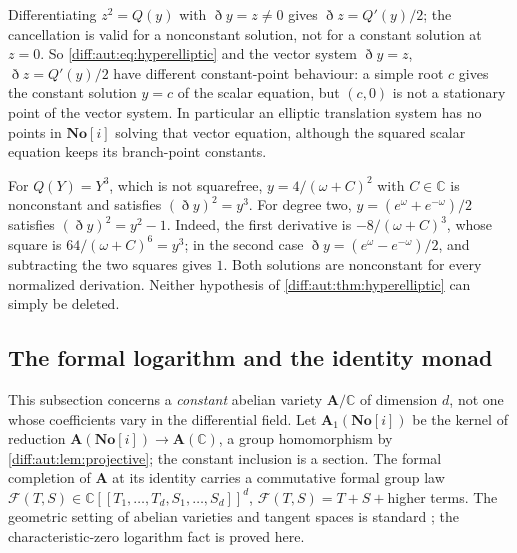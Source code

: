 \documentclass[11pt,letterpaper]{article}
\numberwithin{equation}{section}
\theoremstyle{definition}
\theoremstyle{remark}
\newcommand{\SC}{\mathbf{No}[i]}
\newcommand{\C}{\mathbb C}
\newcommand{\Dn}{\eth}
\begin{document}
\begin{remark}
\label{diff:aut:rem:branchpoints}
Differentiating $z^{2}=Q(y)$ with $\Dn y=z\neq0$ gives $\Dn z=Q'(y)/2$; the
cancellation is valid for a nonconstant solution, not for a constant solution
at $z=0$. So \cref{diff:aut:eq:hyperelliptic} and the vector system
$\Dn y=z$, $\Dn z=Q'(y)/2$ have different constant-point behaviour: a simple root
$c$ gives the constant solution $y=c$ of the scalar equation, but $(c,0)$ is not a
stationary point of the vector system. In particular an elliptic translation
system has no points in $\SC$ solving that vector equation, although the squared
scalar equation keeps its branch-point constants.
\end{remark}

\begin{example}
\label{diff:aut:ex:hypotheses}
For $Q(Y)=Y^{3}$, which is not squarefree, $y=4/(\omega+C)^{2}$ with $C\in\C$ is
nonconstant and satisfies $(\Dn y)^{2}=y^{3}$. For degree two,
$y=(e^{\omega}+e^{-\omega})/2$ satisfies $(\Dn y)^{2}=y^{2}-1$.
Indeed, the first derivative is $-8/(\omega+C)^3$, whose square
is $64/(\omega+C)^6=y^3$; in the second case
$\Dn y=(e^\omega-e^{-\omega})/2$, and subtracting the two
squares gives $1$. Both solutions are nonconstant for every
normalized derivation. Neither hypothesis of
\cref{diff:aut:thm:hyperelliptic} can simply be deleted.
\end{example}

\subsection{The formal logarithm and the identity monad}
\label{diff:aut:sub:formallog}

This subsection concerns a \emph{constant} abelian variety $\mathbf A/\C$ of
dimension $d$, not one whose coefficients vary in the differential field. Let
$\mathbf A_{1}(\SC)$ be the kernel of reduction $\mathbf A(\SC)\to\mathbf A(\C)$,
a group homomorphism by \cref{diff:aut:lem:projective}; the constant inclusion is
a section. The formal completion of $\mathbf A$ at its identity carries a
commutative formal group law
$\mathcal F(T,S)\in\C[[T_{1},\dots,T_{d},S_{1},\dots,S_{d}]]^{d}$,
$\mathcal F(T,S)=T+S+{}$higher terms. The geometric setting of abelian varieties
and tangent spaces is standard \cite[Chapter~I, \S1 and Theorem~6.4]{Milne}; the characteristic-zero logarithm
fact is proved here.
\end{document}
